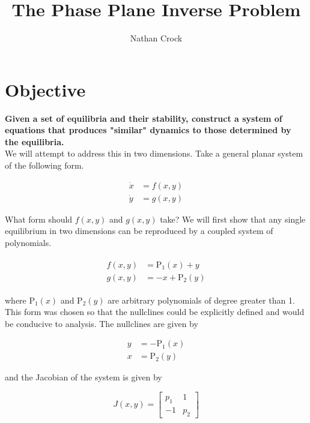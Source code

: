 \documentclass{article}
\title{The Phase Plane Inverse Problem}
\author{Nathan Crock}
\begin{document}
    
    
    \maketitle
    
    

    
    \section{Objective}\label{objective}

\textbf{Given a set of equilibria and their stability, construct a
system of equations that produces "similar" dynamics to those determined
by the equilibria.} \\

We will attempt to address this in two dimensions. Take a general planar system of the following form.

\begin{align*}
\dot x &= f(x,y) \\
\dot y &= g(x,y)
\end{align*}

\noindent What form should $f(x,y)$ and $g(x,y)$ take? We will first show that
any single equilibrium in two dimensions can be reproduced by a coupled system
of polynomials.

\begin{align}
    \begin{split}
    f(x,y) &= \text{P}_1(x)+y \\
    g(x,y) &= -x+\text{P}_2(y) \label{eq:system}
    \end{split}
\end{align}

\noindent where P$_1(x)$ and P$_2(y)$ are arbitrary polynomials of degree greater than 1.
This form was chosen so that the nullclines could be explicitly defined
and would be conducive to analysis. The nullclines are given by

\begin{align}
    y &= -\text{P}_1(x) \label{eq:x-null}\\ 
    x &= \text{P}_2(y) \label{eq:y-null}
\end{align}

\noindent and the Jacobian of the system is given by

\begin{equation}
J(x,y) = \begin{bmatrix}
       p_1 & 1 \\
       -1 & p_2
\end{bmatrix} \label{eq:jacobian}
 \end{equation}
\end{document}
